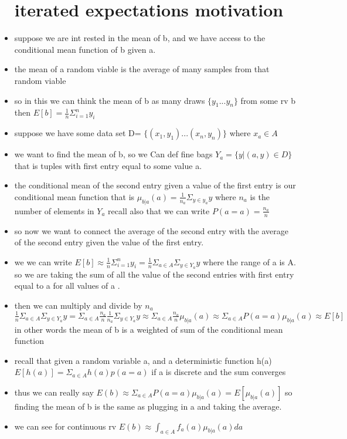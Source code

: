 \documentclass{article}
\begin{document}
\begin{itemize}
\section{iterated expectations motivation}
\item suppose we are int rested in the mean of b, and we have access to the conditional mean function of b given a. 
\item the mean of a random viable is the average of many samples from that random viable
\item so in this  we can think the mean of b as many draws $\{y_1...y_n\}$ from some rv b then $E[b]=\frac{1}{n}\Sigma_{i=1}^{n}y_i$
\item suppose we have some data set D= $\{(x_1,y_1)...(x_n,y_n)\}$ where $x_a\in A$
\item we want to find the mean of b, so we Can def fine bags $Y_{a}=\{y|(a,y)\in D\}$ that is tuples with first entry equal to some value a. 
\item the conditional mean of the second entry given a value of the first entry is our conditional mean function  that is $\mu_{b|a}(a)=\frac{1}{n_a}\Sigma_{y\in y_a}y$ where $n_a$ is the number of elements in $Y_a$
recall also that we can write $P(a=a)=\frac{n_a}{n}$ 
\item so now we want to connect the average of the second entry with the average of the second entry given the value of the first entry. 
\item we we can write $E[b]\approx\frac{1}{n}\Sigma_{i=1}^{n}y_i=\frac{1}{n}\Sigma_{a\in A}\Sigma_{y\in Y_a}y$ where the range of a is A. so we are taking the sum of all the value of the second entries with first entry equal to a for all values of a . 
\item then we can multiply and divide by $n_a$ $\frac{1}{n}\Sigma_{a\in A}\Sigma_{y\in Y_a}y=\Sigma_{a\in A}\frac{n_a}{n}\frac{1}{n_a}\Sigma_{y\in Y_a}y\approx\Sigma_{a\in A}\frac{n_a}{n}\mu_{b|a}(a)\approx \Sigma_{a\in A}P(a=a)\mu_{b|a}(a)\approx E[b]$ in other words the mean of b is a weighted of sum of the conditional mean function 
\item recall that given a random variable a, and a deterministic function h(a) $E[h(a)]=\Sigma_{a\in A}h(a)p(a=a)$ if a is discrete and the sum converges 
\item thus we can really say $E(b)\approx \Sigma_{a\in A}P(a=a)\mu_{b|a}(a)=E[\mu_{b|a}(a)]$ so finding the mean of b is the same as plugging in a and taking the average. 
\item we can see for continuous rv $E(b)\approx \int_{a\in A}f_{a}(a)\mu_{b|a}(a)da$

\end{itemize}
\end{document}
